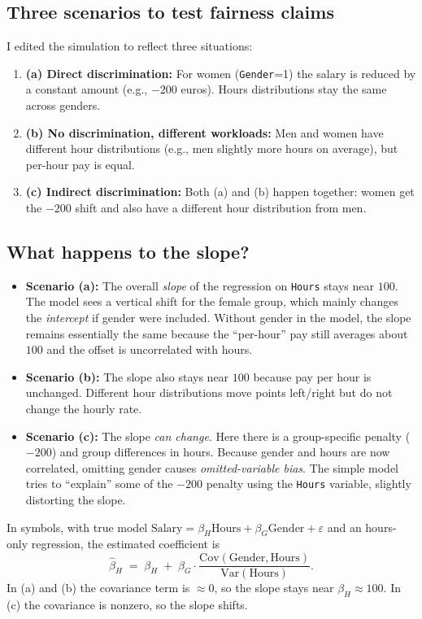 \documentclass[12pt]{article}
\begin{document}
\subsection{Three scenarios to test fairness claims}
I edited the simulation to reflect three situations:
\begin{enumerate}
  \item \textbf{(a) Direct discrimination:} For women (\texttt{Gender}=1) the salary is reduced by a constant amount (e.g., $-200$ euros). Hours distributions stay the same across genders.
  \item \textbf{(b) No discrimination, different workloads:} Men and women have different hour distributions (e.g., men slightly more hours on average), but per-hour pay is equal.
  \item \textbf{(c) Indirect discrimination:} Both (a) and (b) happen together: women get the $-200$ shift and also have a different hour distribution from men.
\end{enumerate}

\subsection{What happens to the slope?}
\begin{itemize}
  \item \textbf{Scenario (a):} The overall \emph{slope} of the regression on \texttt{Hours} stays near $100$. The model sees a vertical shift for the female group, which mainly changes the \emph{intercept} if gender were included. Without gender in the model, the slope remains essentially the same because the ``per-hour'' pay still averages about $100$ and the offset is uncorrelated with hours.
  \item \textbf{Scenario (b):} The slope also stays near $100$ because pay per hour is unchanged. Different hour distributions move points left/right but do not change the hourly rate.
  \item \textbf{Scenario (c):} The slope \emph{can change}. Here there is a group-specific penalty ($-200$) and group differences in hours. Because gender and hours are now correlated, omitting gender causes \emph{omitted-variable bias}. The simple model tries to ``explain'' some of the $-200$ penalty using the \texttt{Hours} variable, slightly distorting the slope.
\end{itemize}

\noindent In symbols, with true model $\text{Salary} = \beta_H \text{Hours} + \beta_G \text{Gender} + \varepsilon$ and an hours-only regression, the estimated coefficient is
\begin{equation*}
\widehat{\beta}_H \;=\; \beta_H \;+\; \beta_G \cdot \frac{\mathrm{Cov}(\text{Gender}, \text{Hours})}{\mathrm{Var}(\text{Hours})}.
\end{equation*}
In (a) and (b) the covariance term is $\approx 0$, so the slope stays near $\beta_H \approx 100$. In (c) the covariance is nonzero, so the slope shifts.
\end{document}
